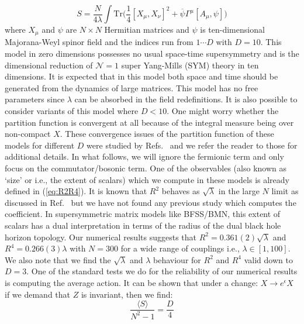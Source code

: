 \documentclass[letter,11pt]{article}
\begin{document}
\begin{equation}
	\label{eq:IKKT} 
S = \frac{N}{4\lambda} \int \mbox{Tr} \Big( \frac{1}{4} [X_\mu, X_\nu]^{2} + \overline{\psi} \Gamma^{\mu} [A_{\mu},\psi] \Big) 
\end{equation}
where $X_{\mu}$ and $\psi$ are $N \times N$ Hermitian matrices and $\psi$ is ten-dimensional Majorana-Weyl spinor field and the indices run from $ 1 \cdots D$ with $D=10$. This model in zero dimensions possesses no usual space-time supersymmetry and is the dimensional reduction of $\mathcal{N}=1$ super Yang-Mills (SYM) theory in ten dimensions. It is expected that in this model both space and time should be generated from the dynamics of large matrices. This model has no free parameters since $\lambda$ can be absorbed in the field redefinitions. It is also possible to consider variants of this model where $D < 10$. One might worry whether the partition function is convergent at all because of the integral measure being over non-compact $X$. These convergence issues of the partition function of these models for different $D$ were studied by Refs.~\cite{Krauth:1998yu,Krauth:1999qw} and we
refer the reader to those for additional details.  In what follows, we will ignore the fermionic 
term and only focus on the commutator/bosonic term. One of the observables (also known as `size' or i.e., the extent of scalars) which we compute in these models is already defined in (\ref{eq:R2R4}). It is known that $R^2$ behaves as $\sqrt{\lambda}$ in the large $N$ limit as discussed in Ref.~\cite{Hotta:1998en} but we have not found any previous study
which computes the coefficient. In supersymmetric matrix models like BFSS/BMN, this extent of scalars has a dual interpretation in terms of the radius of 
the dual black hole horizon topology.  Our numerical results suggests 
that $R^2 = 0.361(2) \sqrt{\lambda}$ 
and $R^4 = 0.266(3) \lambda$ with $N = 300$ for a wide range of couplings i.e., 
$\lambda \in [1,100]$. 
We also note that we find the $\sqrt{\lambda}$ and $\lambda$ behaviour for 
$R^2$ and $R^4$ valid down to $D=3$. 
One of the standard tests we do for the reliability of our numerical results is 
computing the average action. It can be shown that under a 
change: $X \to e^{\epsilon} X$ if we demand that $Z$ is invariant, 
then we find:
\begin{equation}
\label{eq:SD_IKKT1} 
	\frac{\langle S \rangle}{N^2 - 1} = \frac{D}{4} 
\end{equation}
\end{document}
